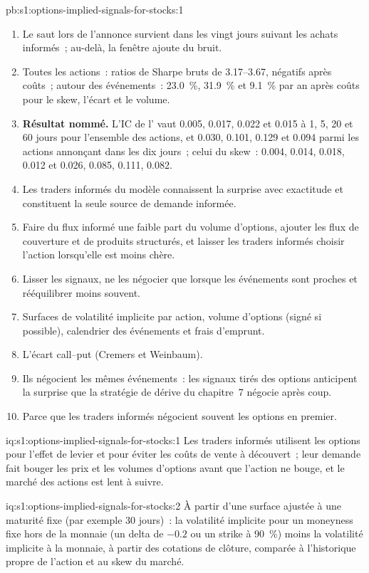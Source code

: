 \begin{solution}{pb:s1:options-implied-signals-for-stocks:1}
\begin{enumerate}
\item Le saut lors de l'annonce survient dans les vingt jours suivant les achats informés~; au-delà, la fenêtre ajoute du bruit.
\item Toutes les actions~: ratios de Sharpe bruts de 3.17--3.67, négatifs après coûts~; autour des événements~: 23.0~\%, 31.9~\% et 9.1~\% par an après coûts pour le skew, l'écart et le volume.
\item \textbf{Résultat nommé.} L'IC de l' vaut 0.005, 0.017, 0.022 et 0.015 à 1, 5, 20 et 60 jours pour l'ensemble des actions, et 0.030, 0.101, 0.129 et
0.094 parmi les actions annonçant dans les dix jours~; celui du skew~: 0.004, 0.014, 0.018, 0.012 et 0.026, 0.085, 0.111, 0.082.
\item Les traders informés du modèle connaissent la surprise avec exactitude et constituent la seule source de demande informée.
\item Faire du flux informé une faible part du volume d'options, ajouter les flux de couverture et de produits structurés, et laisser les traders informés choisir l'action lorsqu'elle est moins chère.
\item Lisser les signaux, ne les négocier que lorsque les événements sont proches et rééquilibrer moins souvent.
\item Surfaces de volatilité implicite par action, volume d'options (signé si possible), calendrier des événements et frais d'emprunt.
\item L'écart call--put (Cremers et Weinbaum).
\item Ils négocient les mêmes événements~: les signaux tirés des options anticipent la surprise que la stratégie de dérive du chapitre~7 négocie après coup.
\item Parce que les traders informés négocient souvent les options en premier.
\end{enumerate}
\end{solution}

\begin{solution}{iq:s1:options-implied-signals-for-stocks:1}
Les traders informés utilisent les options pour l'effet de levier et pour éviter les coûts de vente à découvert~; leur demande fait bouger les prix et les volumes d'options avant que l'action ne bouge, et le marché des
actions est lent à suivre.
\end{solution}

\begin{solution}{iq:s1:options-implied-signals-for-stocks:2}
À partir d'une surface ajustée à une maturité fixe (par exemple 30 jours)~: la volatilité implicite pour un moneyness fixe hors de la monnaie (un delta de $-0.2$ ou un strike à
90~\%) moins la volatilité implicite à la monnaie, à partir des cotations de clôture, comparée à l'historique propre de l'action et au skew du marché.
\end{solution}

